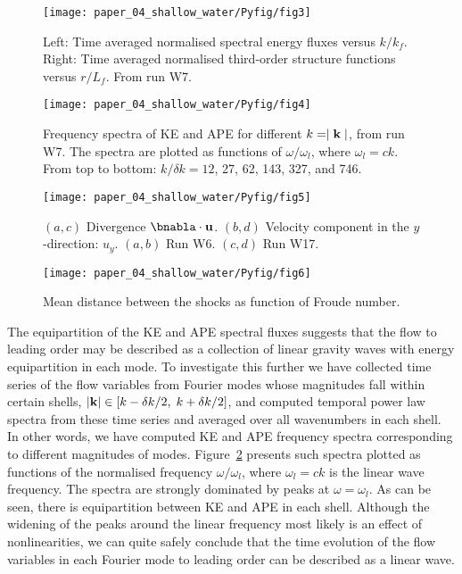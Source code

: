 \begin{figure}
\centerline{\texttt{[image: paper\_04\_shallow\_water/Pyfig/fig3]}}
\caption{Left: Time averaged normalised spectral energy fluxes versus $ k/k_f
$. Right: Time averaged normalised third-order structure functions versus $
r/L_f $. From run W7. }
\label{Flux}
\end{figure}


\begin{figure}
\centerline{\texttt{[image: paper\_04\_shallow\_water/Pyfig/fig4]}}
\caption{Frequency spectra of KE and APE for different $ k = \mid {\bf k} \mid
$, from run W7. The spectra are plotted as functions of $\omega/\omega_l$,
where $\omega_l = c k$. From top to bottom: $ k /\delta k = 12$, 27, 62, 143,
327, and 746. }
\label{fig_spatiotemp_spectra}
\end{figure}

\begin{figure}
\centerline{\texttt{[image: paper\_04\_shallow\_water/Pyfig/fig5]}}
\caption{$(a,c)$ Divergence $ \bnabla \cdot {\bf u} $.  $(b,d)$ Velocity
component in the $ y $-direction: $ u_y $. $(a,b)$ Run W6. $(c, d)$ Run W17.
}
\label{Physical}
\end{figure}

\begin{figure}
\centerline{\texttt{[image: paper\_04\_shallow\_water/Pyfig/fig6]}}
\caption{Mean distance between the shocks as function of Froude number.  }
\label{fig_distance}
\end{figure}




The equipartition of the KE and APE spectral fluxes suggests that the flow to
leading order may be described as a collection of linear gravity waves with energy
equipartition in each mode. To investigate this further we have
collected time series of the flow variables from Fourier modes whose magnitudes
fall within certain shells, $ |{\bf k}| \in [ k -\delta k/2, \; k+
\delta k/2] $, and computed temporal power law spectra from these time series
and averaged over all wavenumbers in each shell. In other words, we have
computed KE and APE frequency spectra corresponding to different magnitudes of
modes. Figure~\ref{fig_spatiotemp_spectra} presents such spectra plotted as
functions of the normalised frequency $\omega/\omega_l$, where $ \omega_l = ck
$ is the linear wave frequency. The spectra are strongly dominated by peaks at
$\omega = \omega_l$. As can be seen, there is equipartition between KE and APE
in each shell. Although the widening of the peaks around the linear frequency
most likely is an effect of nonlinearities, we can quite safely conclude that
the time evolution of the flow variables in each Fourier mode to leading order
can be described as a linear wave.

